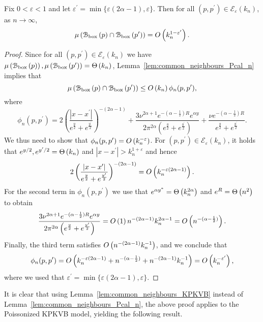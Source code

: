 \begin{lemma}\label{cor:expected_common_neighbours_Ecal_set}
Fix $0 < \varepsilon < 1$ and let $\varepsilon^\prime = \min\{\varepsilon(2\alpha - 1),\varepsilon\}$. Then for all $(p,p^\prime) \in \mathcal{E}_\varepsilon(k_n)$, as $n \to \infty$,
\[
	\mu\left({\mathcal B}_{\text{box}}\left(p\right) \cap {\mathcal B}_{\text{box}}\left(p^\prime\right)\right) = O\left(k_n^{1-\varepsilon^\prime}\right).
\] 
\end{lemma}

\begin{proof}
Since for all $(p,p^\prime) \in \mathcal{E}_\varepsilon(k_n)$ we have $\mu\left({\mathcal B}_{\text{box}}\left(p\right)\right), \mu\left({\mathcal B}_{\text{box}}\left(p^\prime\right)\right) = \Theta\left(k_n\right)$, Lemma~\ref{lem:common_neighbours_Pcal_n} implies that
\[
	\mu\left({\mathcal B}_{\text{box}}\left(p\right) \cap {\mathcal B}_{\text{box}}\left(p^\prime\right)\right) \le O\left(k_n\right) \phi_n(p,p^\prime),
\]
where
\[
	\phi_n(p,p^\prime) = 2\left(\frac{|x - x^\prime|}{e^{\frac{y}{2}} + e^{\frac{y^\prime}{2}}}\right)^{-(2\alpha - 1)} 
		+ \frac{3 \nu^{2\alpha + 1}e^{-(\alpha - \frac{1}{2})R} e^{\alpha y}}{2 \pi^{2\alpha}\left(
		e^{\frac{y}{2}} + e^{\frac{y^\prime}{2}}\right)}
		+ \frac{\nu e^{-(\alpha - \frac{1}{2})R}}{e^{\frac{y}{2}} + e^{\frac{y^\prime}{2}}}. 
\]
We thus need to show that $\phi_n(p,p^\prime) = O\left(k_n^{-\varepsilon}\right)$. For $(p,p^\prime) \in \mathcal{E}_\varepsilon(k_n)$, it holds that $e^{y/2}, e^{y^\prime/2} = \Theta\left(k_n\right)$ and $|x - x^\prime| > k_n^{1+\varepsilon}$ and hence
\begin{align*}
	 2\left(\frac{|x - x^\prime|}{e^{\frac{y}{2}} + e^{\frac{y^\prime}{2}}}\right)^{-(2\alpha - 1)}
	 =	O\left(k_n^{-\varepsilon(2\alpha - 1)}\right).
\end{align*}
For the second term in $\phi_n(p,p^\prime)$ we use that $e^{\alpha y^\ast} = \Theta\left(k_n^{2\alpha}\right)$ and $e^{R} = \Theta\left(n^2\right)$ to obtain
\[
	\frac{3 \nu^{2\alpha + 1}e^{-(\alpha - \frac{1}{2})R} e^{\alpha y}}{2 \pi^{2\alpha}\left(
			e^{\frac{y}{2}} + e^{\frac{y^\prime}{2}}\right)}
	= O\left(1\right) n^{-(2\alpha - 1)} k_n^{2\alpha - 1} = O\left(n^{-(\alpha - \frac{1}{2})}\right).
\]
Finally, the third term satisfies $O\left(n^{-(2\alpha - 1)}k_n^{-1}\right)$, and we conclude that
\[
	\phi_n(p,p^\prime) = O\left(k_n^{-\varepsilon(2\alpha - 1)} + n^{-(\alpha - \frac{1}{2})}
	+ n^{-(2\alpha - 1)}k_n^{-1}\right) = O\left(k_n^{-\varepsilon^\prime}\right),
\]
where we used that $\varepsilon^\prime = \min\{\varepsilon(2\alpha - 1),\varepsilon\}$. 
\end{proof}

It is clear that using Lemma~\ref{lem:common_neighbours_KPKVB} instead of Lemma~\ref{lem:common_neighbours_Pcal_n}, the above proof applies to the Poissonized KPKVB model, yielding the following result.

